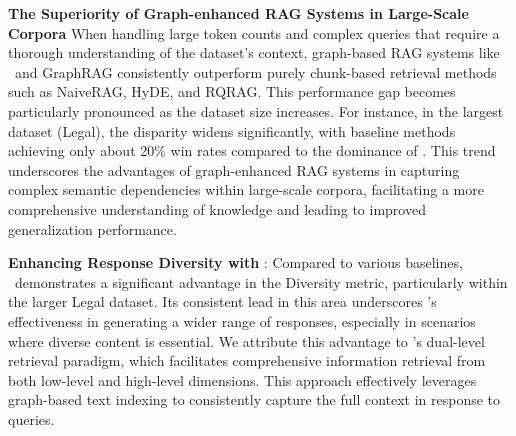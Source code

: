 \textbf{The Superiority of Graph-enhanced RAG Systems in Large-Scale Corpora}
When handling large token counts and complex queries that require a thorough understanding of the dataset's context, graph-based RAG systems like \model\ and GraphRAG consistently outperform purely chunk-based retrieval methods such as NaiveRAG, HyDE, and RQRAG. This performance gap becomes particularly pronounced as the dataset size increases. For instance, in the largest dataset (Legal), the disparity widens significantly, with baseline methods achieving only about 20\% win rates compared to the dominance of \model. This trend underscores the advantages of graph-enhanced RAG systems in capturing complex semantic dependencies within large-scale corpora, facilitating a more comprehensive understanding of knowledge and leading to improved generalization performance.

\textbf{Enhancing Response Diversity with \model}:
Compared to various baselines, \model\ demonstrates a significant advantage in the Diversity metric, particularly within the larger Legal dataset. Its consistent lead in this area underscores \model's effectiveness in generating a wider range of responses, especially in scenarios where diverse content is essential. We attribute this advantage to \model's dual-level retrieval paradigm, which facilitates comprehensive information retrieval from both low-level and high-level dimensions. This approach effectively leverages graph-based text indexing to consistently capture the full context in response to queries.

